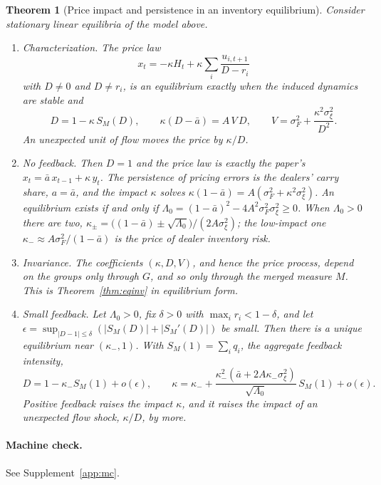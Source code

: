 \documentclass[12pt]{article}
\newtheorem{theorem}{Theorem}[section]
\theoremstyle{definition}
\theoremstyle{remark}
\begin{document}
\begin{theorem}[Price impact and persistence in an inventory equilibrium]\label{thm:inventory}
Consider stationary linear equilibria of the model above.
\begin{enumerate}[label=(\roman*),itemsep=1pt]
\item \emph{Characterization.} The price law
\[
 x_t=-\kappa H_t+\kappa\sum_i\frac{u_{i,t+1}}{D-r_i}
\]
with $D\ne0$ and $D\ne r_i$, is an equilibrium exactly when the induced dynamics are stable and
\begin{equation}\label{eq:inventory_eq}
 D=1-\kappa\,S_M(D),\qquad \kappa(D-\bar a)=A\,V\,D,\qquad V=\sigma_F^2+\frac{\kappa^2\sigma_\xi^2}{D^2}.
\end{equation}
An unexpected unit of flow moves the price by $\kappa/D$.
\item \emph{No feedback.} Then $D=1$ and the price law is exactly the paper's $x_t=\bar a\,x_{t-1}+\kappa\,y_t$. The persistence of pricing errors is the dealers' carry share, $a=\bar a$, and the impact $\kappa$ solves $\kappa(1-\bar a)=A(\sigma_F^2+\kappa^2\sigma_\xi^2)$. An equilibrium exists if and only if $\Lambda_0=(1-\bar a)^2-4A^2\sigma_F^2\sigma_\xi^2\ge0$. When $\Lambda_0>0$ there are two, $\kappa_\pm=\bigl((1-\bar a)\pm\sqrt{\Lambda_0}\bigr)/(2A\sigma_\xi^2)$; the low-impact one $\kappa_-\approx A\sigma_F^2/(1-\bar a)$ is the price of dealer inventory risk.
\item \emph{Invariance.} The coefficients $(\kappa,D,V)$, and hence the price process, depend on the groups only through $G$, and so only through the merged measure $M$. This is Theorem~\ref{thm:eqinv} in equilibrium form.
\item \emph{Small feedback.} Let $\Lambda_0>0$, fix $\delta>0$ with $\max_ir_i<1-\delta$, and let $\epsilon=\sup_{|D-1|\le\delta}(|S_M(D)|+|S_M'(D)|)$ be small. Then there is a unique equilibrium near $(\kappa_-,1)$. With $S_M(1)=\sum_iq_i$, the aggregate feedback intensity,
\[
 D=1-\kappa_-S_M(1)+o(\epsilon),\qquad \kappa=\kappa_-+\frac{\kappa_-^2(\bar a+2A\kappa_-\sigma_\xi^2)}{\sqrt{\Lambda_0}}\,S_M(1)+o(\epsilon).
\]
Positive feedback raises the impact $\kappa$, and it raises the impact of an unexpected flow shock, $\kappa/D$, by more.
\end{enumerate}
\end{theorem}

\paragraph{Machine check.} See Supplement~\ref{app:mc}.
\end{document}
